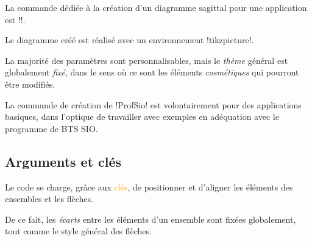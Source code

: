 \documentclass[french,a4paper,11pt]{article}
\newcommand\Cle[1]{{\small\sffamily\textlangle \textcolor{orange}{#1}\textrangle}}
\begin{document}
{{\begin{cautionblock}
La commande dédiée à la création d'un diagramme sagittal pour une application est \motcletex!\DiagrammeSagittal!.

Le diagramme créé est réalisé avec un environnement \motcletex!tikzpicture!.
\end{cautionblock}

\begin{DemoCode}

\end{DemoCode}

\begin{DemoCode}[]
\end{DemoCode}

\begin{warningblock}
La majorité des paramètres sont personnalisables, mais le \textit{thème} général est globalement \textit{fixé}, dans le sens où ce sont les éléments \textit{cosmétiques} qui pourront être modifiés.

\smallskip

La commande de création de \packagetex!ProfSio! est volontairement pour des applications basiques, dans l'optique de travailler avec exemples en adéquation avec le programme de BTS SIO.
\end{warningblock}

\subsection{Arguments et clés}

\begin{DemoCode}

\end{DemoCode}

\begin{noteblock}
Le code se charge, grâce aux \Cle{clés}, de positionner et d'aligner les éléments des ensembles et les flèches.

De ce fait, les \textit{écarts} entre les éléments d'un ensemble sont fixées globalement, tout comme le style général des flèches.
\end{noteblock}

}}
\end{document}
